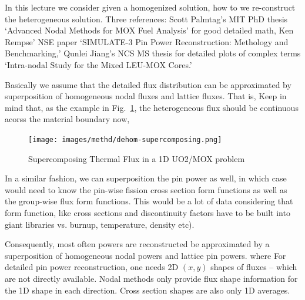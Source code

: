 \documentclass{school-22.211-notes}
\date{May  9, 2012}
\begin{document}
\maketitle

 \label{de-homogenization}
In this lecture we consider given a homogenized solution, how to we re-construct the heterogeneous solution. Three references: Scott Palmtag's MIT PhD thesis `Advanced Nodal Methods for MOX Fuel Analysis' for good detailed math, Ken Rempse' NSE paper `SIMULATE-3 Pin Power Reconstruction: Methology and Benchmarking,' Qunlei Jiang's NCS MS thesis for detailed plots of complex terms `Intra-nodal Study for the Mixed LEU-MOX Cores.' 

Basically we assume that the detailed flux distribution can be approximated by superposition of homogeneous nodal fluxes and lattice fluxes. That is, 
Keep in mind that, as the example in Fig.~\ref{dehom-supercomposing}, the heterogeneous flux should be continuous acorss the material boundary now, 
\begin{figure}[ht]
  \centering
  \texttt{[image: images/methd/dehom-supercomposing.png]}
  \caption{Supercomposing Thermal Flux in a 1D UO2/MOX problem} \label{dehom-supercomposing}
\end{figure}
In a similar fashion, we can superposition the pin power as well, in which case would need to know the pin-wise fission cross section form functions as well as the group-wise flux form functions. This would be a lot of data considering that form function, like cross sections and discontinuity factors have to be built into giant libraries vs. burnup, temperature, density etc). 

Consequently, most often powers are reconstructed be approximated by a superposition of homogeneous nodal powers and lattice pin powers. 
where
For detailed pin power reconstruction, one needs 2D $(x,y)$ shapes of fluxes -- which are not directly available. Nodal methods only provide flux shape information for the 1D shape in each direction. Cross section shapes are also only 1D averages. 
\end{document}
